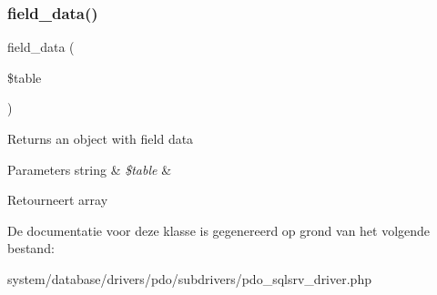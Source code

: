 \subsubsection{\texorpdfstring{field\_data()}{field\_data()}}
{\footnotesize\ttfamily field\+\_\+data (\begin{DoxyParamCaption}\item[{}]{\$table }\end{DoxyParamCaption})}

Returns an object with field data


\begin{DoxyParams}[1]{Parameters}
string & {\em \$table} & \\
\hline
\end{DoxyParams}
\begin{DoxyReturn}{Retourneert}
array 
\end{DoxyReturn}


De documentatie voor deze klasse is gegenereerd op grond van het volgende bestand\+:\begin{DoxyCompactItemize}
\item 
system/database/drivers/pdo/subdrivers/pdo\+\_\+sqlsrv\+\_\+driver.\+php\end{DoxyCompactItemize}
